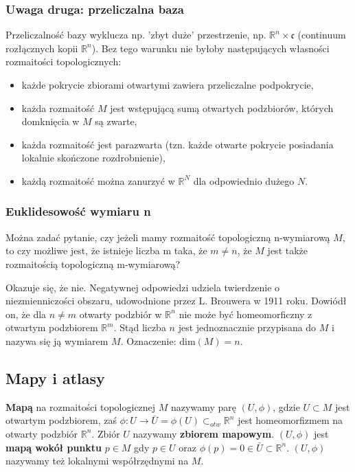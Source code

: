 \subsubsection{Uwaga druga: przeliczalna baza}
Przeliczalność bazy wyklucza np. 'zbyt duże' przestrzenie, np. $\mathbb{R}^n \times \mathfrak{c}$ (continuum rozłącznych kopii $\mathbb{R}^n$). Bez tego warunku nie byłoby następujących własności rozmaitości topologicznych:
\begin{itemize}
	\item każde pokrycie zbiorami otwartymi zawiera przeliczalne podpokrycie,
	\item każda rozmaitość $M$ jest wstępującą sumą otwartych podzbiorów, których domknięcia w $M$ są zwarte,
	\item każda rozmaitość jest parazwarta (tzn. każde otwarte pokrycie posiadania lokalnie skończone rozdrobnienie),
	\item każdą rozmaitość można zanurzyć w $\mathbb{R}^N$ dla odpowiednio dużego $N$.
\end{itemize}

\subsubsection{Euklidesowość wymiaru n}
Można zadać pytanie, czy jeżeli mamy rozmaitość topologiczną n-wymiarową $M$, to czy możliwe jest, że istnieje liczba m taka, że $m \neq n$, że $M$ jest także rozmaitością topologiczną m-wymiarową?

Okazuje się, że nie. Negatywnej odpowiedzi udziela twierdzenie o niezmienniczości obszaru, udowodnione przez L. Brouwera w 1911 roku. Dowiódł on, że dla $n \neq m$ otwarty podzbiór w $\mathbb{R}^n$ nie może być homeomorficzny z otwartym podzbiorem $\mathbb{R}^m$. Stąd liczba $n$ jest jednoznacznie przypisana do $M$ i nazywa się ją wymiarem $M$. Oznaczenie: $\mathrm{dim}(M) = n$.

\subsection{Mapy i atlasy}
\begin{definition}
	\textbf{Mapą} na rozmaitości topologicznej $M$ nazywamy parę $(U,\phi)$, gdzie $U \subset M$ jest otwartym podzbiorem, zaś $\phi : U \to \bar{U} = \phi(U) \subset_{otw} \mathbb{R}^n$ jest homeomorfizmem na otwarty podzbiór $\mathbb{R}^n$. Zbiór $U$ nazywamy \textbf{zbiorem mapowym}. $(U, \phi)$ jest \textbf{mapą wokół punktu} $p \in M$ gdy $p \in U$ oraz $\phi(p) = 0 \in \bar{U} \subset \mathbb{R}^n$. $(U,\phi)$ nazywamy też lokalnymi współrzędnymi na $M$.
\end{definition}

